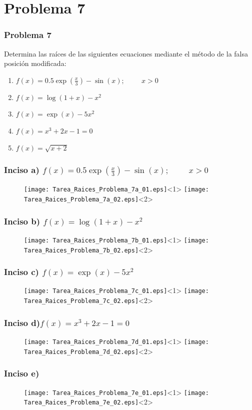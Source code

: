\section{Problema 7}
\begin{frame}
\frametitle{Problema 7}
Determina las ra\'{i}ces de las siguientes ecuaciones mediante el m\'{e}todo de la falsa posici\'{o}n modificada:
	\begin{enumerate}
		\renewcommand{\arraystretch}{1.5}
		\item $f(x) = 0.5\exp(\frac{x}{3})- \sin(x); \hspace{1cm} x > 0$
		\item $f(x) = \log(1 + x) - x^{2}$
		\item $f(x) = \exp(x) - 5x^{2}$
		\item $f(x) = x^{3} + 2x - 1 = 0$
		\item $f(x) = \sqrt{x+2}$
	\end{enumerate}
\end{frame}
\begin{frame}
\frametitle{Inciso a) $f(x) = 0.5\exp(\frac{x}{3})- \sin(x); \hspace{1cm} x > 0$}
\begin{figure}
	\centering
	\texttt{[image: Tarea\_Raices\_Problema\_7a\_01.eps]}<1>
	\texttt{[image: Tarea\_Raices\_Problema\_7a\_02.eps]}<2>
\end{figure}
\end{frame}
\begin{frame}
\frametitle{Inciso b) $f(x) = \log(1 + x) - x^{2}$}
\begin{figure}
	\centering
	\texttt{[image: Tarea\_Raices\_Problema\_7b\_01.eps]}<1>
	\texttt{[image: Tarea\_Raices\_Problema\_7b\_02.eps]}<2>	
\end{figure}
\end{frame}
\begin{frame}
\frametitle{Inciso c) $f(x) = \exp(x) - 5x^{2}$}
\begin{figure}
	\centering
	\texttt{[image: Tarea\_Raices\_Problema\_7c\_01.eps]}<1>
	\texttt{[image: Tarea\_Raices\_Problema\_7c\_02.eps]}<2>	
\end{figure}
\end{frame}
\begin{frame}
\frametitle{Inciso d)$f(x) = x^{3} + 2x - 1 = 0$ }
\begin{figure}
	\centering
	\texttt{[image: Tarea\_Raices\_Problema\_7d\_01.eps]}<1>
	\texttt{[image: Tarea\_Raices\_Problema\_7d\_02.eps]}<2>	
\end{figure}
\end{frame}
\begin{frame}
\frametitle{Inciso e)}
\begin{figure}
	\centering
	\texttt{[image: Tarea\_Raices\_Problema\_7e\_01.eps]}<1>
	\texttt{[image: Tarea\_Raices\_Problema\_7e\_02.eps]}<2>	
\end{figure}
\end{frame}
